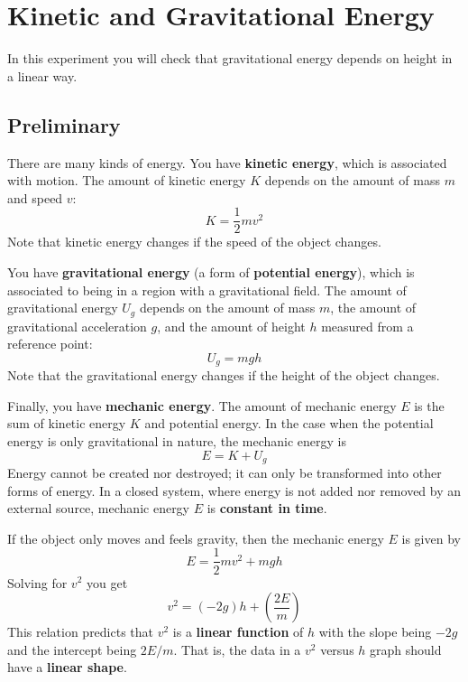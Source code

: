 \setcounter{chapter}{7}
\chapter{Kinetic and Gravitational Energy}
In this experiment you will check that gravitational energy depends on height in a linear way.
\section{Preliminary}
There are many kinds of energy. You have \textbf{kinetic energy}, which is associated with motion. The amount of kinetic energy $K$ depends on the amount of mass $m$ and speed $v$:
\begin{equation}
    K = \frac{1}{2} m v^{2}
\end{equation}
Note that kinetic energy changes if the speed of the object changes.

You have \textbf{gravitational energy} (a form of \textbf{potential energy}), which is associated to being in a region with a gravitational field. The amount of gravitational energy $U_{g}$ depends on the amount of mass $m$, the amount of gravitational acceleration $g$, and the amount of height $h$ measured from a reference point:
\begin{equation}
    U_{g} = m g h
\end{equation}
Note that the gravitational energy changes if the height of the object changes.

Finally, you have \textbf{mechanic energy}. The amount of mechanic energy $E$ is the sum of kinetic energy $K$ and potential energy. In the case when the potential energy is only gravitational in nature, the mechanic energy is
\begin{equation}
    E = K + U_{g}
\end{equation}
Energy cannot be created nor destroyed; it can only be transformed into other forms of energy. In a closed system, where energy is not added nor removed by an external source, mechanic energy $E$ is \textbf{constant in time}.

If the object only moves and feels gravity, then the mechanic energy $E$ is given by
\begin{equation}
    E = \frac{1}{2} m v^{2} + m g h
\end{equation}
Solving for $v^{2}$ you get
\begin{equation} \label{eq.07.vv}
    v^{2} = \left( - 2 g \right) h + \left( \frac{2 E}{m} \right)
\end{equation}
This relation predicts that $v^{2}$ is a \textbf{linear function} of $h$ with the slope being $-2g$ and the intercept being $2 E / m$. That is, the data in a $v^{2}$ versus $h$ graph should have a \textbf{linear shape}.
